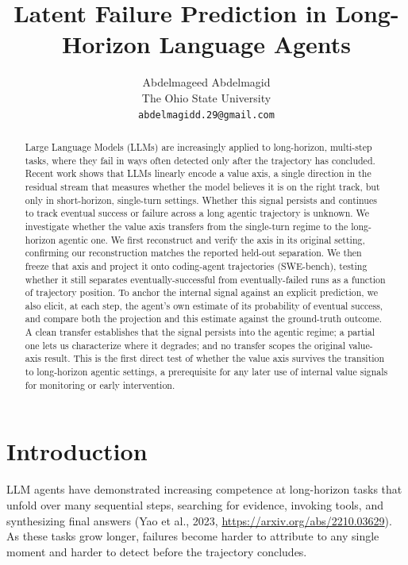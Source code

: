 \documentclass{article}
\title{Latent Failure Prediction in Long-Horizon Language Agents}
\author{%
  Abdelmageed Abdelmagid \\
  The Ohio State University \\
  \texttt{abdelmagidd.29@gmail.com} \\
}
\begin{document}
\maketitle

\begin{abstract}
Large Language Models (LLMs) are increasingly applied to long-horizon, multi-step tasks, where they fail in ways often detected only after the trajectory has concluded. Recent work shows that LLMs linearly encode a value axis, a single direction in the residual stream that measures whether the model believes it is on the right track, but only in short-horizon, single-turn settings. Whether this signal persists and continues to track eventual success or failure across a long agentic trajectory is unknown. We investigate whether the value axis transfers from the single-turn regime to the long-horizon agentic one. We first reconstruct and verify the axis in its original setting, confirming our reconstruction matches the reported held-out separation. We then freeze that axis and project it onto coding-agent trajectories (SWE-bench), testing whether it still separates eventually-successful from eventually-failed runs as a function of trajectory position. To anchor the internal signal against an explicit prediction, we also elicit, at each step, the agent's own estimate of its probability of eventual success, and compare both the projection and this estimate against the ground-truth outcome. A clean transfer establishes that the signal persists into the agentic regime; a partial one lets us characterize where it degrades; and no transfer scopes the original value-axis result. This is the first direct test of whether the value axis survives the transition to long-horizon agentic settings, a prerequisite for any later use of internal value signals for monitoring or early intervention.
\end{abstract}

\section{Introduction}

LLM agents have demonstrated increasing competence at long-horizon tasks that unfold over many sequential steps, searching for evidence, invoking tools, and synthesizing final answers (Yao et al., 2023, \url{https://arxiv.org/abs/2210.03629}). As these tasks grow longer, failures become harder to attribute to any single moment and harder to detect before the trajectory concludes.
\end{document}
